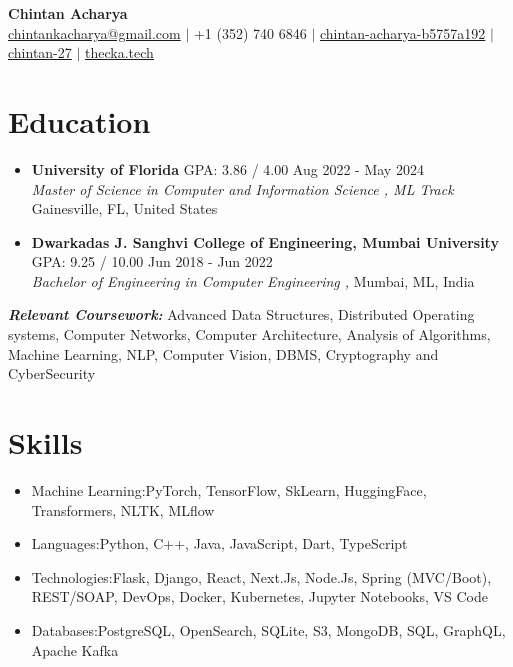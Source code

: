 \documentclass[a4paper,10pt]{article}
\begin{document}
\pagestyle{empty}

\begin{center}
    \textbf{\LARGE Chintan Acharya} \\
    \vspace{7pt} 
    \href{mailto:chintankacharya@gmail.com}{chintankacharya@gmail.com} $\vert$ +1 (352) 740 6846 $\vert$ \href{https://linkedin.com/in/chintan-acharya-b5757a192}{\faLinkedin  { } chintan-acharya-b5757a192} $\vert$ \href{https://github.com/chintan-27}{\faGithub { } chintan-27} $\vert$ \href{https://thecka.tech}{thecka.tech}

\end{center}

\vspace{-20pt}
\section*{Education}
\vspace{-5pt}

\begin{itemize}
    \item \textbf{University of Florida} GPA: 3.86 / 4.00  \hfill Aug 2022 - May 2024 \\
\textit{Master of Science in Computer and Information Science , ML Track} \hfill Gainesville, FL, United States
\vspace{5pt}
\item \textbf{Dwarkadas J. Sanghvi College of Engineering, Mumbai University} GPA: 9.25 / 10.00  \hfill Jun 2018 - Jun 2022 \\
\textit{Bachelor of Engineering in Computer Engineering , } \hfill Mumbai, ML, India
 \\
\end{itemize}
\vspace{-5pt}
    \textit{\textbf{Relevant Coursework:}} Advanced Data Structures, Distributed Operating systems, Computer Networks, Computer Architecture, Analysis of Algorithms, Machine Learning, NLP, Computer Vision, DBMS, Cryptography and CyberSecurity

\vspace{-10pt}
\section*{Skills}
\vspace{-5pt}
\begin{itemize}
   \item Machine Learning:PyTorch, TensorFlow, SkLearn, HuggingFace, Transformers, NLTK, MLflow  
\item Languages:Python, C++, Java, JavaScript, Dart, TypeScript  
\item Technologies:Flask, Django, React, Next.Js, Node.Js, Spring (MVC/Boot), REST/SOAP, DevOps, Docker, Kubernetes, Jupyter Notebooks, VS Code  
\item Databases:PostgreSQL, OpenSearch, SQLite, S3, MongoDB, SQL, GraphQL, Apache Kafka
\end{itemize}
\end{document}
